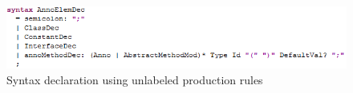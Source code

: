 \documentclass[a4paper, 11pt]{article}
\begin{document}
\begin{figure}[h]
	\centering
	\includegraphics[width=\textwidth]{images/UnlabeledProduction.png}
	\caption{Syntax declaration using unlabeled production rules}
	\label{fig:UL}
\end{figure}
\end{document}
